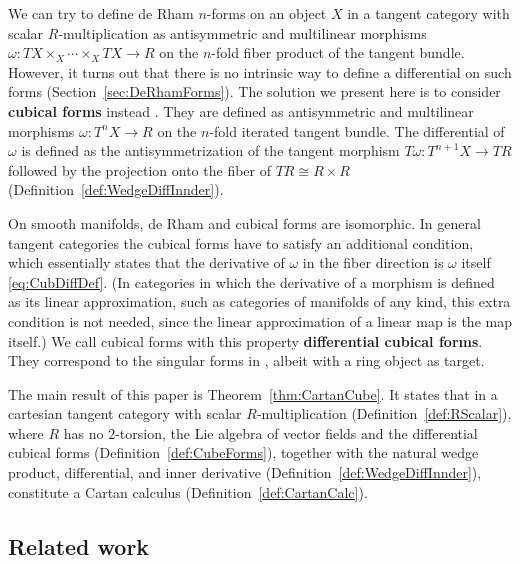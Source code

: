 \documentclass[12pt,reqno, a4paper]{amsart}
\numberwithin{equation}{section}
\theoremstyle{plain}
\theoremstyle{definition}
\theoremstyle{remark}
\begin{document}
We can try to define de Rham $n$-forms on an object $X$ in a tangent category with scalar $R$-multiplication as antisymmetric and multilinear morphisms $\omega: TX \times_X \cdots \times_X TX \to R$ on the $n$-fold fiber product of the tangent bundle. However, it turns out that there is no intrinsic way to define a differential on such forms (Section~\ref{sec:DeRhamForms}). The solution we present here is to consider \textbf{cubical forms} instead \cite[\S I.14.2]{Kock:2006}. They are defined as antisymmetric and multilinear morphisms $\omega: T^n X \to R$ on the $n$-fold iterated tangent bundle. The differential of $\omega$ is defined as the antisymmetrization of the tangent morphism $T\omega: T^{n+1} X \to TR$ followed by the projection onto the fiber of $TR \cong R \times R$ (Definition~\ref{def:WedgeDiffInnder}).

On smooth manifolds, de Rham and cubical forms are isomorphic. In general tangent categories the cubical forms have to satisfy an additional condition, which essentially states that the derivative of $\omega$ in the fiber direction is $\omega$ itself \eqref{eq:CubDiffDef}. (In categories in which the derivative of a morphism is defined as its linear approximation, such as categories of manifolds of any kind, this extra condition is not needed, since the linear approximation of a linear map is the map itself.) We call cubical forms with this property \textbf{differential cubical forms}. They correspond to the singular forms in \cite{CruttwellLucyshynWright:2018}, albeit with a ring object as target. 

The main result of this paper is Theorem~\ref{thm:CartanCube}. It states that in a cartesian tangent category with scalar $R$-multiplication (Definition~\ref{def:RScalar}), where $R$ has no $2$-torsion, the Lie algebra of vector fields and the differential cubical forms (Definition~\ref{def:CubeForms}), together with the natural wedge product, differential, and inner derivative (Definition~\ref{def:WedgeDiffInnder}), constitute a Cartan calculus (Definition~\ref{def:CartanCalc}). 



\subsection{Related work}
\label{sec:RelatedWork}
\end{document}
